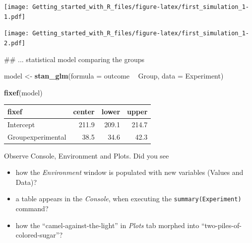 \documentclass[]{svmono}
\newenvironment{Shaded}{\begin{snugshade}}{\end{snugshade}}
\newcommand{\KeywordTok}[1]{\textcolor[rgb]{0.13,0.29,0.53}{\textbf{#1}}}
\newcommand{\DataTypeTok}[1]{\textcolor[rgb]{0.13,0.29,0.53}{#1}}
\newcommand{\StringTok}[1]{\textcolor[rgb]{0.31,0.60,0.02}{#1}}
\newcommand{\OperatorTok}[1]{\textcolor[rgb]{0.81,0.36,0.00}{\textbf{#1}}}
\newcommand{\NormalTok}[1]{#1}
\providecommand{\tightlist}{%
  \setlength{\itemsep}{0pt}\setlength{\parskip}{0pt}}
\theoremstyle{definition}
\theoremstyle{definition}
\theoremstyle{definition}
\theoremstyle{remark}
\begin{document}
\texttt{[image: Getting\_started\_with\_R\_files/figure-latex/first\_simulation\_1-1.pdf]}

\begin{Shaded}
\end{Shaded}

\texttt{[image: Getting\_started\_with\_R\_files/figure-latex/first\_simulation\_1-2.pdf]}

\begin{Shaded}
\begin{Highlighting}[]
\NormalTok{## ... statistical model comparing the groups}

\NormalTok{model <-}\StringTok{ }\KeywordTok{stan_glm}\NormalTok{(}\DataTypeTok{formula =}\NormalTok{ outcome }\OperatorTok{~}\StringTok{ }\NormalTok{Group, }
            \DataTypeTok{data =}\NormalTok{ Experiment) }
\end{Highlighting}
\end{Shaded}

\begin{Shaded}
\begin{Highlighting}[]
\KeywordTok{fixef}\NormalTok{(model)}
\end{Highlighting}
\end{Shaded}

\begin{longtable}[]{@{}lrrr@{}}
\toprule
fixef & center & lower & upper\tabularnewline
\midrule
\endhead
Intercept & 211.9 & 209.1 & 214.7\tabularnewline
Groupexperimental & 38.5 & 34.6 & 42.3\tabularnewline
\bottomrule
\end{longtable}

Observe Console, Environment and Plots. Did you see

\begin{itemize}
\tightlist
\item
  how the \emph{Environment} window is populated with new variables
  (Values and Data)?
\item
  a table appears in the \emph{Console}, when executing the
  \texttt{summary(Experiment)} command?
\item
  how the ``camel-against-the-light'' in \emph{Plots} tab morphed into
  ``two-piles-of-colored-sugar''?
\end{itemize}
\end{document}
